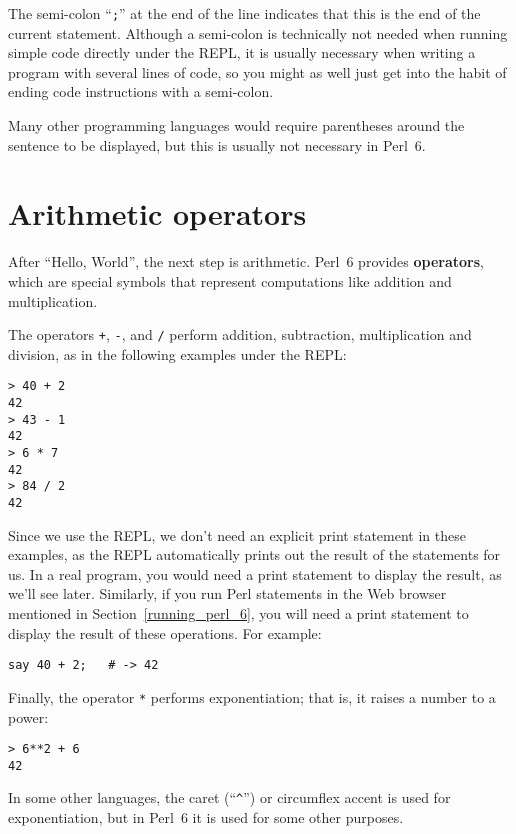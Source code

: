 The semi-colon ``{\tt ;}'' at the end of the line indicates 
that this is the end of the current statement. Although a 
semi-colon is technically not needed when running 
simple code directly under the REPL, it is usually 
necessary when writing a program with several lines of code, 
so you might as well just get into the habit of ending code 
instructions with a semi-colon.

Many other programming languages would require parentheses 
around the sentence to be displayed, but this is usually 
not necessary in Perl~6.

\section{Arithmetic operators}

After ``Hello, World'', the next step is arithmetic.  Perl~6 provides
{\bf operators}, which are special symbols that represent computations
like addition and multiplication.  

The operators {\tt +}, {\tt -}, {\tt *} and {\tt /} perform addition,
subtraction, multiplication and division, as in the following examples
under the REPL:

\begin{verbatim}
> 40 + 2
42
> 43 - 1
42
> 6 * 7
42
> 84 / 2
42
\end{verbatim}
%

Since we use the REPL, we don't need an explicit print 
statement in these examples, as the REPL automatically 
prints out the result of the statements for us. In a real 
program, you would need a print statement to display 
the result, as we'll see later. Similarly, if you run 
Perl statements in the Web browser mentioned in 
Section~\ref{running_perl_6}, you will need a 
print statement to display the result of these operations. 
For example:

\begin{verbatim}
say 40 + 2;   # -> 42
\end{verbatim}


Finally, the operator {\tt **} performs exponentiation; that is,
it raises a number to a power:

\begin{verbatim}
> 6**2 + 6
42
\end{verbatim}
%
In some other languages, the caret (``\verb"^"'') or 
circumflex accent is used for exponentiation, but in 
Perl~6 it is used for some other purposes.
%



